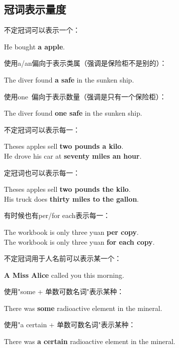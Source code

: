 \documentclass[UTF8]{ctexart}
\newcommand{\littf}[1]{{\hspace{3pt}\ttfamily #1}}
\begin{document}
\subsection{冠词表示量度}
    不定冠词可以表示一个：
    \begin{center}
        \large\ttfamily
        He bought \textbf{a apple}.\\[6mm]
    \end{center}
    使用\littf{a/an}偏向于表示类属（强调是保险柜不是别的）：
    \begin{center}
        \large\ttfamily
        The diver found \textbf{a safe} in the sunken ship.\\[6mm]
    \end{center}
    使用\littf{one~}偏向于表示数量（强调是只有一个保险柜）：
    \begin{center}
        \large\ttfamily
        The diver found \textbf{one safe} in the sunken ship.\\[6mm]
    \end{center}
    不定冠词可以表示每一：
    \begin{center}
        \large\ttfamily
        Theses apples sell \textbf{two pounds a kilo}.\\[3mm]
        He drove his car at \textbf{seventy miles an hour}.\\[6mm]
    \end{center}
    定冠词也可以表示每一：
    \begin{center}
        \large\ttfamily
        Theses apples sell \textbf{two pounds the kilo}.\\[3mm]
        His truck does \textbf{thirty miles to the gallon}.\\[6mm]
    \end{center}
    有时候也有\littf{per/for each}表示每一：
    \begin{center}
        \large\ttfamily
        The workbook is only three yuan \textbf{per copy}.\\[3mm]
        The workbook is only three yuan \textbf{for each copy}.\\[6mm]
    \end{center}
    不定冠词用于人名前可以表示某一个：
    \begin{center}
        \large\ttfamily
        \textbf{A Miss Alice} called you this morning.\\[6mm]
    \end{center}
    使用\littf{"some + 单数可数名词"}表示某种：
    \begin{center}
        \large\ttfamily
        There was \textbf{some} radioactive element in the mineral.
    \end{center}
    使用\littf{"a certain + 单数可数名词"}表示某种：
    \begin{center}
        \large\ttfamily
        There was \textbf{a certain} radioactive element in the mineral.\\[6mm]
    \end{center}
\end{document}
